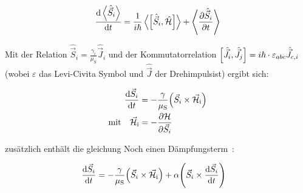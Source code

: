 \documentclass[main.tex]{subfiles}
\begin{document}
\begin{align}
	\dv{\expval{\hat{\vec{S}}_i}}{t} = \frac{1}{i\hbar}
	\expval{\qty[\hat{\vec{S}}_i,
			\hat{\mathcal{H}}]} + \expval{\pdv{\hat{\vec{S}}_i}{t}}
\end{align}


Mit der Relation 
\(\hat{\vec{S}}_i = \frac{\gamma_i}{\mu_{\text{S}}}\hat{\vec{J}}_i\) 
und der Kommutatorrelation 
\(\qty[\hat{\vec{J}}_i, \hat{\vec{J}}_j] = i \hbar \cdot \varepsilon_{abc} \hat{\vec{J}}_{c,i}\) 
(wobei \(\varepsilon\) das Levi-Civita Symbol und \(\hat{\vec{J}}\) der Drehimpulsist) ergibt sich:

\begin{align}
	\dv{\vec{S}_i}{t}
	& = -\frac{\gamma}{\mu_{\text{S}}}
	\qty(\vec{S}_i \times \vec{\mathcal{H}}_{\text{i}})\\
	\text{mit} \quad \vec{\mathcal{H}}_{\text{i}} 
	& = - \pdv{\mathcal{H}}{\vec{S}_i}
\end{align}


zusätzlich enthält die gleichung Noch einen Dämpfungsterm~\cite{Gilbert-damping}:

\begin{align}
	\dv{\vec{S}_i}{t} & = -\frac{\gamma }{\mu_{\text{S}}}\qty(\vec{S}_i \times \vec{\mathcal{H}}_{\text{i}}) 
	+ \alpha \qty(\vec{S}_i \times \dv{\vec{S}_i}{t})
\end{align}
\end{document}
